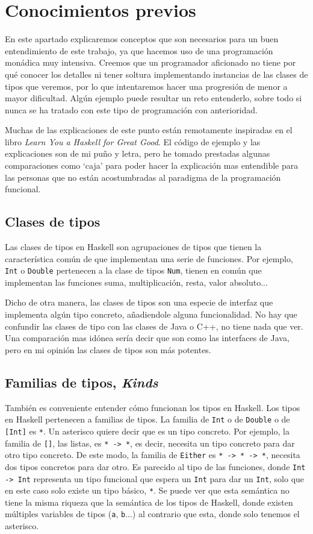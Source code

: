 \documentclass[class=article, crop=false]{standalone}
\begin{document}
\section{Conocimientos previos}\label{sec:con_prev}
En este apartado explicaremos conceptos que son necesarios para un buen entendimiento de este
trabajo, ya que hacemos uso de una programación monádica muy intensiva. Creemos que un
programador aficionado no tiene por qué conocer los detalles ni tener soltura implementando
instancias de las clases de tipos que veremos, por lo que intentaremos hacer una progresión
de menor a mayor dificultad. Algún ejemplo puede resultar un reto entenderlo, sobre todo si
nunca se ha tratado con este tipo de programación con anterioridad.

Muchas de las explicaciones de este punto están remotamente inspiradas en el libro\textit{
Learn You a Haskell for Great Good}\cite{Lipovaca:2011:LYH:2018642}. El código de ejemplo y
las explicaciones son de mi puño y letra, pero he tomado prestadas algunas comparaciones como
`caja' para poder hacer la explicación mas entendible para las personas que no están
acostumbradas al paradigma de la programación funcional.

\subsection{Clases de tipos}
Las clases de tipos en Haskell son agrupaciones de tipos que tienen la característica común
de que implementan una serie de funciones. Por ejemplo, \verb`Int` o \verb`Double` pertenecen
a la clase de tipos \verb`Num`, tienen en común que implementan las funciones suma,
multiplicación, resta, valor absoluto...

Dicho de otra manera, las clases de tipos son una especie de interfaz que implementa algún
tipo concreto, añadiendole alguna funcionalidad. No hay que confundir las clases de tipo con
las clases de Java o C++, no tiene nada que ver. Una comparación mas idónea sería decir que
son como las interfaces de Java, pero en mi opinión las clases de tipos son más potentes.

\subsection{Familias de tipos, \textit{Kinds}}
También es conveniente entender cómo funcionan los tipos en Haskell. Los tipos en Haskell
pertenecen a familias de tipos. La familia de \verb`Int` o de \verb`Double` o de \verb`[Int]`
es \verb`*`. Un asterisco quiere decir que es un tipo concreto. Por ejemplo, la familia de
\verb`[]`, las listas, es \verb`* -> *`, es decir, necesita un tipo concreto para dar otro
tipo concreto. De este modo, la familia de \verb`Either` es \verb`* -> * -> *`, necesita dos
tipos concretos para dar otro. Es parecido al tipo de las funciones, donde \verb`Int -> Int`
representa un tipo funcional que espera un \verb`Int` para dar un \verb`Int`, solo que en
este caso solo existe un tipo básico, \verb`*`. Se puede ver que esta semántica no tiene la
misma riqueza que la semántica de los tipos de Haskell, donde existen múltiples variables de
tipos (\verb`a`, \verb`b`...) al contrario que esta, donde solo tenemos el asterisco.
\end{document}
